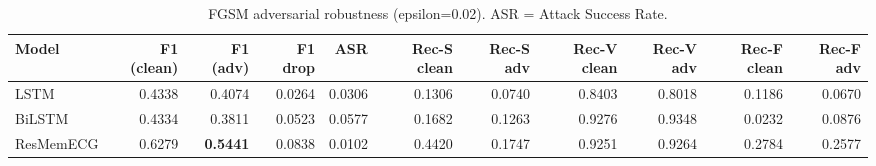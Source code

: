\begin{table}[h!]
\centering
\caption{FGSM adversarial robustness (epsilon=0.02). ASR = Attack Success Rate.}
\label{tab:fgsm_robust}
\begin{tabular}{lrrrrrrrrrr}
\toprule
Model & F1 (clean) & F1 (adv) & F1 drop & ASR & Rec-S clean & Rec-S adv & Rec-V clean & Rec-V adv & Rec-F clean & Rec-F adv \\
\midrule
LSTM & 0.4338 & 0.4074 & 0.0264 & 0.0306 & 0.1306 & 0.0740 & 0.8403 & 0.8018 & 0.1186 & 0.0670 \\
BiLSTM & 0.4334 & 0.3811 & 0.0523 & 0.0577 & 0.1682 & 0.1263 & 0.9276 & 0.9348 & 0.0232 & 0.0876 \\
ResMemECG & 0.6279 & \textbf{0.5441} & 0.0838 & 0.0102 & 0.4420 & 0.1747 & 0.9251 & 0.9264 & 0.2784 & 0.2577 \\
\bottomrule
\end{tabular}
\end{table}